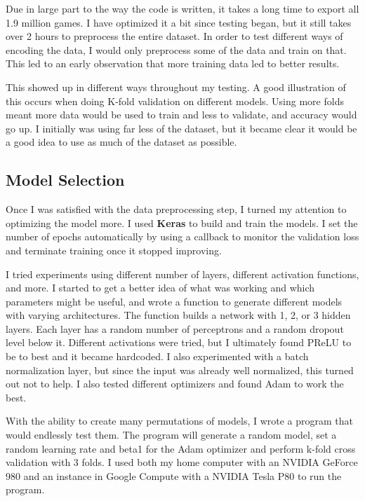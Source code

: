 \documentclass[twoside,twocolumn]{article}
\begin{document}
Due in large part to the way the code is written, it takes a long time to export all 1.9 million games.  I have optimized it a bit since testing began, but it still takes over 2 hours to preprocess the entire dataset.  In order to test different ways of encoding the data, I would only preprocess some of the data and train on that.  This led to an early observation that more training data led to better results.

This showed up in different ways throughout my testing.  A good illustration of this occurs when doing K-fold validation on different models.  Using more folds meant more data would be used to train and less to validate, and accuracy would go up.  I initially was using far less of the dataset, but it became clear it would be a good idea to use as much of the dataset as possible.

\subsection{Model Selection}

Once I was satisfied with the data preprocessing step, I turned my attention to optimizing the model more.  I used \textbf{Keras} to build and train the models.  I set the number of epochs automatically by using a callback to monitor the validation loss and terminate training once it stopped improving.

I tried experiments using different number of layers, different activation functions, and more.  I started to get a better idea of what was working and which parameters might be useful, and wrote a function to generate different models with varying architectures.  The function builds a network with 1, 2, or 3 hidden layers.  Each layer has a random number of perceptrons and a random dropout level below it.  Different activations were tried, but I ultimately found PReLU to be to best and it became hardcoded.  I also experimented with a batch normalization layer, but since the input was already well normalized, this turned out not to help.  I also tested different optimizers and found Adam to work the best.

With the ability to create many permutations of models, I wrote a program that would endlessly test them.  The program will generate a random model, set a random learning rate and beta1 for the Adam optimizer and perform k-fold cross validation with 3 folds.  I used both my home computer with an NVIDIA GeForce 980 and an instance in Google Compute with a NVIDIA Tesla P80 to run the program.
\end{document}
